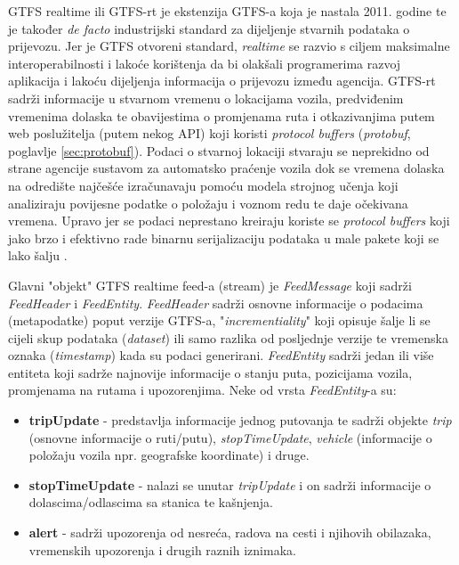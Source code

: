 \documentclass[zavrsnirad]{fer}
\begin{document}
GTFS realtime ili GTFS-rt je ekstenzija GTFS-a koja je nastala 2011. godine te je također \textit{de facto}
industrijski standard za dijeljenje stvarnih podataka o prijevozu. Jer je GTFS otvoreni standard,
\textit{realtime} se razvio s ciljem maksimalne interoperabilnosti i lakoće korištenja da bi olakšali
programerima razvoj aplikacija i lakoću dijeljenja informacija o prijevozu između agencija. GTFS-rt
sadrži informacije u stvarnom vremenu o lokacijama vozila, predviđenim vremenima dolaska te
obavijestima o promjenama ruta i otkazivanjima putem web poslužitelja (putem nekog API) koji koristi \textit{protocol buffers} (\textit{protobuf}, poglavlje \ref{sec:protobuf}). Podaci o stvarnoj lokaciji stvaraju se neprekidno od strane agencije sustavom za automatsko praćenje vozila dok se vremena dolaska na odredište najčešće izračunavaju pomoću modela strojnog učenja koji analiziraju povijesne podatke o položaju i voznom redu te daje očekivana vremena. Upravo jer se podaci neprestano kreiraju koriste se \textit{protocol buffers} koji jako brzo i efektivno rade binarnu serijalizaciju podataka u male pakete koji se lako šalju \cite{GTFS-realtime}.

Glavni "objekt" GTFS realtime feed-a (stream) je \textit{FeedMessage} koji sadrži \textit{FeedHeader} i \textit{FeedEntity}.
\textit{FeedHeader} sadrži osnovne informacije o podacima (metapodatke) poput verzije GTFS-a, "\textit{incrementiality}" koji opisuje šalje li se cijeli skup podataka (\textit{dataset}) ili samo razlika od posljednje verzije te vremenska oznaka (\textit{timestamp}) kada su podaci generirani.
\textit{FeedEntity} sadrži jedan ili više entiteta koji sadrže najnovije informacije o stanju puta, pozicijama vozila, promjenama na rutama i upozorenjima. Neke od vrsta \textit{FeedEntity}-a su: 

\begin{itemize}
	\item \textbf{tripUpdate} - predstavlja informacije jednog putovanja te sadrži objekte \textit{trip} (osnovne informacije o ruti/putu), \textit{stopTimeUpdate}, \textit{vehicle} (informacije o položaju vozila npr. geografske koordinate) i druge.
	\item \textbf{stopTimeUpdate} - nalazi se unutar \textit{tripUpdate} i on sadrži informacije o dolascima/odlascima sa stanica te kašnjenja.
	\item \textbf{alert} - sadrži upozorenja od nesreća, radova na cesti i njihovih obilazaka, vremenskih upozorenja i drugih raznih iznimaka.
\end{itemize}
\end{document}
